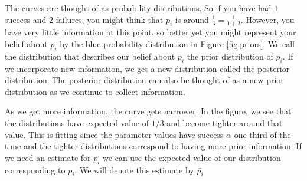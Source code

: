 The curves are thought of as probability distributions.  So if you have had $1$ success and $2$ failures, you might think that $p_i$ is around $\frac{1}{3} = \frac{1}{1+2}$. However, you have very little information at this point, so better yet you might represent your belief about $p_i$ by the blue probability distribution in Figure \ref{fig:priors}.  We call the distribution that describes our belief about $p_i$ the prior distribution of $p_i$.  If we incorporate new information, we get a new distribution called the posterior distribution.  The posterior distribution can also be thought of as a new prior distribution as we continue to collect information.

As we get more information, the curve gets narrower.  In the figure, we see that the distributions have expected value of $1/3$ and become tighter around that value.  This is fitting since the parameter values have success $\alpha$ one third of the time and the tighter distributions correspond to having more prior information.  If we need an estimate for $p_i$ we can use the expected value of our distribution corresponding to $p_i$.  We will denote this estimate by $\bar{p_i}$


